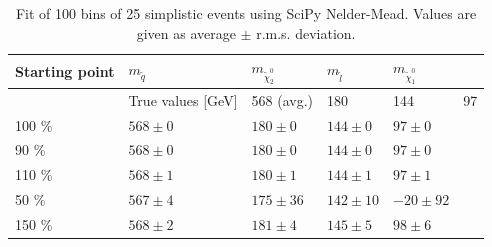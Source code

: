 \documentclass[twoside,english]{uiofysmaster}
\begin{document}
\begin{table}[hbt]
	\centering
	\begin{tabular}{| l | l | l | l | l | l |}
		\hline
		Starting point &  $m_{\tilde{q}}$ & $m_{\tilde{\chi}_2^0}$ & $m_{\tilde{l}}$ & $m_{\tilde{\chi}_1^0}$ \\ \hline
					   & True values [GeV] 	& 568 (avg.) 	& 180 	& 144 	& 97 \\ \hline
		100 \%		   & $568 \pm 0$ & $180 \pm 0 $ & $144 \pm 0 $ & $97 \pm 0	$ \\ \hline
		90 \% 		   & $568 \pm 0$ & $180 \pm 0 $ & $144 \pm 0 $ & $97 \pm 0	$ \\ \hline
		110 \%		   & $568 \pm 1$ & $180 \pm 1 $ & $144 \pm 1 $ & $97 \pm 1	$ \\ \hline
		50 \% 		   & $567 \pm 4$ & $175 \pm 36$ & $142 \pm 10$ & $-20 \pm 92$   \\ \hline
		150 \%		   & $568 \pm 2$ & $181 \pm 4 $ & $145 \pm 5 $ & $98 \pm 6 $	 \\ \hline
	\end{tabular}
	\caption{Fit of 100 bins of 25 simplistic events using SciPy Nelder-Mead. Values are given as average $\pm$ r.m.s. deviation. }
	\label{table:fits_100_bins_simplistic}
\end{table}
\end{document}
